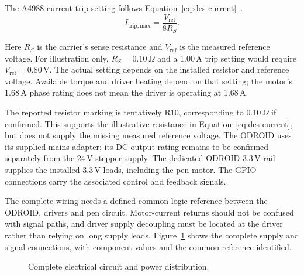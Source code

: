 The A4988 current-trip setting follows Equation~\ref{eq:des-current}~\cite[p.~9]{a4988ds}.
\begin{equation}
I_{\mathrm{trip,max}}=\frac{V_{\mathrm{ref}}}{8R_S}.
\label{eq:des-current}
\end{equation}

Here $R_S$ is the carrier's sense resistance and $V_{\mathrm{ref}}$ is the measured reference voltage. For illustration only, $R_S=0.10\,\Omega$ and a 1.00\,A trip setting would require $V_{\mathrm{ref}}=0.80$\,V. The actual setting depends on the installed resistor and reference voltage. Available torque and driver heating depend on that setting; the motor's 1.68\,A phase rating does not mean the driver is operating at 1.68\,A.~\cite[hardware clarifications; reproduce.py]{brauneevidence2026,braunepipeline2026}

The reported resistor marking is tentatively R10, corresponding to 0.10\,$\Omega$ if confirmed. This supports the illustrative resistance in Equation~\ref{eq:des-current}, but does not supply the missing measured reference voltage. The ODROID uses its supplied mains adapter; its DC output rating remains to be confirmed separately from the 24\,V stepper supply. The dedicated ODROID 3.3\,V rail supplies the installed 3.3\,V loads, including the pen motor. The GPIO connections carry the associated control and feedback signals.~\cite[hardware clarifications; reproduce.py]{brauneevidence2026,braunepipeline2026}

The complete wiring needs a defined common logic reference between the ODROID, drivers and pen circuit. Motor-current returns should not be confused with signal paths, and driver supply decoupling must be located at the driver rather than relying on long supply leads. Figure~\ref{fig:des-complete-circuit} shows the complete supply and signal connections, with component values and the common reference identified.~\cite[hardware clarifications]{brauneevidence2026}


\begin{figure}[!htbp]\centering
{}
\caption{Complete electrical circuit and power distribution.~\cite{brauneevidence2026,braunepipeline2026}}
\label{fig:des-complete-circuit}
\end{figure}


